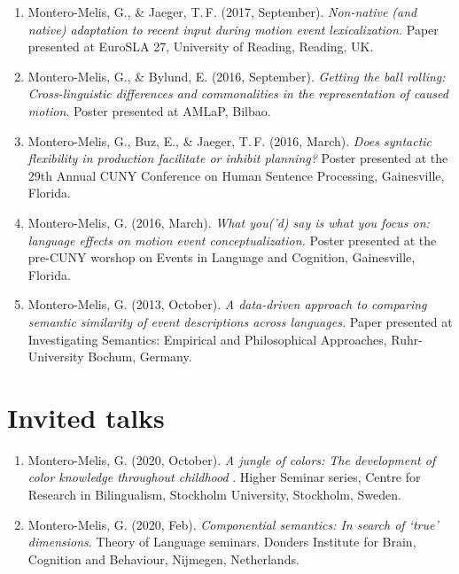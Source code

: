 \documentclass[margin, 11pt]{res} %
\begin{document}
\begin{resume}
\begin{enumerate}
\item Montero-Melis, G., \& Jaeger, T.\,F. (2017, September). \emph{Non-native (and native) adaptation to recent input during motion event lexicalization.} Paper presented at EuroSLA 27, University of Reading, Reading, UK.

\item Montero-Melis, G., \& Bylund, E. (2016, September). \emph{Getting the ball rolling: Cross-linguistic differences and commonalities in the representation of caused motion}. Poster presented at AMLaP, Bilbao.

\item Montero-Melis, G., Buz, E., \& Jaeger, T.\,F. (2016, March). \emph{Does syntactic flexibility in production facilitate or inhibit planning?} Poster presented at the 29th Annual CUNY Conference on Human Sentence Processing, Gainesville, Florida.

\item Montero-Melis, G. (2016, March). \emph{What you('d) say is what you focus on: language effects on motion event conceptualization.} Poster presented at the pre-CUNY worshop on Events in Language and Cognition, Gainesville, Florida.

\item Montero-Melis, G. (2013, October). \emph{A data-driven approach to comparing semantic similarity of event descriptions across languages.} Paper presented at Investigating Semantics: Empirical and Philosophical Approaches, Ruhr-University Bochum, Germany.

\end{enumerate}



\section{\sc Invited talks}

\begin{enumerate}

\item Montero-Melis, G. (2020, October). \textit{A jungle of colors: The development of color knowledge throughout childhood
}. Higher Seminar series, Centre for Research in Bilingualism, Stockholm University, Stockholm, Sweden.

\item Montero-Melis, G. (2020, Feb). \textit{Componential semantics: 
In search of `true' dimensions}. Theory of Language seminars. Donders Institute for Brain, Cognition and Behaviour, Nijmegen, Netherlands.


\end{enumerate}
\end{resume}
\end{document}
